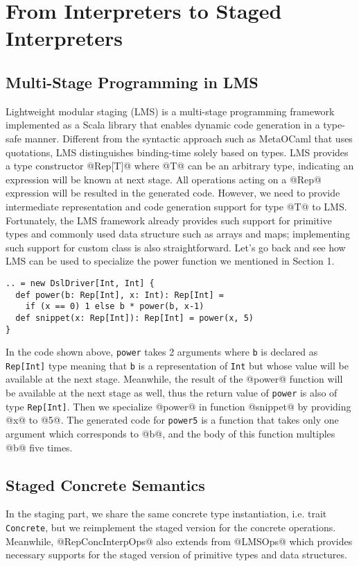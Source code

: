 \section{From Interpreters to Staged Interpreters} \label{stagedinterp}

\subsection{Multi-Stage Programming in LMS}
Lightweight modular staging (LMS) \cite{DBLP:conf/gpce/RompfO10} is a multi-stage programming framework implemented 
as a Scala library that enables dynamic code generation in a type-safe manner.
Different from the syntactic approach such as MetaOCaml \cite{DBLP:conf/flops/Kiselyov14} that uses quotations, 
LMS distinguishes binding-time solely based on types.
LMS provides a type constructor @Rep[T]@ where @T@ can be an arbitrary type, indicating an expression will be 
known at next stage. All operations acting on a @Rep@ expression will be resulted in the generated code. However,
we need to provide intermediate representation and code generation support for type @T@ to LMS. 
Fortunately, the LMS framework already provides
such support for primitive types and commonly used data structure such as arrays and maps; implementing such support
for custom class is also straightforward. Let's go back and see how LMS can be used to specialize the power function
we mentioned in Section 1.

\begin{lstlisting}
.. = new DslDriver[Int, Int] {
  def power(b: Rep[Int], x: Int): Rep[Int] =
    if (x == 0) 1 else b * power(b, x-1)
  def snippet(x: Rep[Int]): Rep[Int] = power(x, 5)
}
\end{lstlisting}

In the code shown above, \texttt{power} takes 2 arguments where \texttt{b} is declared as \texttt{Rep[Int]} type 
meaning that \texttt{b} is a representation of \texttt{Int} but whose value will be available at the next stage. 
Meanwhile, the result of the @power@ function will be available at the next stage as well, thus the return value 
of \texttt{power} is also of type \texttt{Rep[Int]}. 
Then we specialize @power@ in function @snippet@ by providing @x@ to @5@.
The generated code for \texttt{power5} is a function that takes only one argument which corresponds to @b@,
and the body of this function multiples @b@ five times.

\subsection{Staged Concrete Semantics} 
In the staging part, we share the same concrete type instantiation, 
i.e. trait \texttt{Concrete}, but we reimplement the staged version for the concrete operations.
Meanwhile, @RepConcInterpOps@ also extends from @LMSOps@ which provides necessary supports for the 
staged version of primitive types and data structures. 

